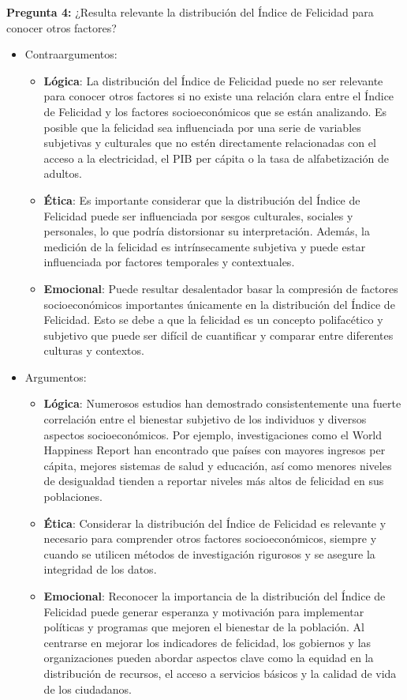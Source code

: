\newpage
\textbf{Pregunta 4:} ¿Resulta relevante la distribución del Índice de Felicidad para conocer otros factores?
\begin{itemize}
    \item Contraargumentos:
    \begin{itemize}
        \item \textbf{Lógica}: La distribución del Índice de Felicidad puede no ser relevante para conocer otros factores si no existe una relación clara entre el Índice de Felicidad y los factores socioeconómicos que se están analizando. Es posible que la felicidad sea influenciada por una serie de variables subjetivas y culturales que no estén directamente relacionadas con el acceso a la electricidad, el PIB per cápita o la tasa de alfabetización de adultos. 
        \item \textbf{Ética}: Es importante considerar que la distribución del Índice de Felicidad puede ser influenciada por sesgos culturales, sociales y personales, lo que podría distorsionar su interpretación. Además, la medición de la felicidad es intrínsecamente subjetiva y puede estar influenciada por factores temporales y contextuales.
        \item \textbf{Emocional}: Puede resultar desalentador basar la compresión de factores socioeconómicos importantes únicamente en la distribución del Índice de Felicidad. Esto se debe a que la felicidad es un concepto polifacético y subjetivo que puede ser difícil de cuantificar y comparar entre diferentes culturas y contextos.
    \end{itemize}
    \item Argumentos:
    \begin{itemize}
        \item \textbf{Lógica}: Numerosos estudios han demostrado consistentemente una fuerte correlación entre el bienestar subjetivo de los individuos y diversos aspectos socioeconómicos. Por ejemplo, investigaciones como el World Happiness Report han encontrado que países con mayores ingresos per cápita, mejores sistemas de salud y educación, así como menores niveles de desigualdad tienden a reportar niveles más altos de felicidad en sus poblaciones.
        \item \textbf{Ética}: Considerar la distribución del Índice de Felicidad es relevante y necesario para comprender otros factores socioeconómicos, siempre y cuando se utilicen métodos de investigación rigurosos y se asegure la integridad de los datos. 
        \item \textbf{Emocional}: Reconocer la importancia de la distribución del Índice de Felicidad puede generar esperanza y motivación para implementar políticas y programas que mejoren el bienestar de la población. Al centrarse en mejorar los indicadores de felicidad, los gobiernos y las organizaciones pueden abordar aspectos clave como la equidad en la distribución de recursos, el acceso a servicios básicos y la calidad de vida de los ciudadanos. 

\end{itemize}
\end{itemize}
